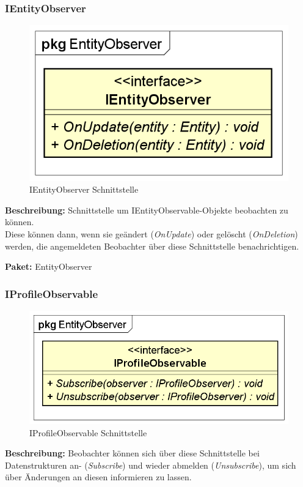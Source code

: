\documentclass[a4paper]{scrreprt}
\begin{document}
\subsubsection{IEntityObserver}
\begin{figure}[H]
\centering
\includegraphics[width=0.45\textheight]{graphics/Klassendiagramme/Model/IEntityObserver.png}
\caption{IEntityObserver Schnittstelle}
\end{figure}
\textbf{Beschreibung:} Schnittstelle um IEntityObservable-Objekte beobachten zu können. \\
Diese können dann, wenn sie geändert (\textit{OnUpdate}) oder gelöscht (\textit{OnDeletion}) werden, die angemeldeten Beobachter über diese Schnittstelle benachrichtigen.

\textbf{Paket:} EntityObserver

\subsubsection{IProfileObservable}
\begin{figure}[H]
\centering
\includegraphics[width=0.45\textheight]{graphics/Klassendiagramme/Model/IProfileObservable.png}
\caption{IProfileObservable Schnittstelle}
\end{figure}
\textbf{Beschreibung:} Beobachter können sich über diese Schnittstelle bei Datenstrukturen an- (\textit{Subscribe}) und wieder abmelden (\textit{Unsubscribe}), um sich über Änderungen an diesen informieren zu lassen.
\end{document}
